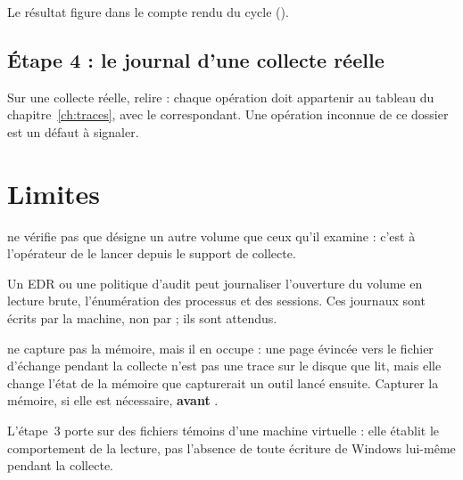 \documentclass[11pt,a4paper,oneside]{report}
\begin{document}
Le résultat figure dans le compte rendu du cycle ().

\section{Étape 4 : le journal d'une collecte réelle}

Sur une collecte réelle, relire  : chaque
opération doit appartenir au tableau du chapitre~\ref{ch:traces}, avec le
 correspondant. Une opération inconnue de ce dossier est un
défaut à signaler.

\chapter{Limites}

\begin{description}[style=nextline,leftmargin=1.2em]
  \item[Dossier de sortie] \wac{} ne vérifie pas que  désigne un
        autre volume que ceux qu'il examine : c'est à l'opérateur de le lancer
        depuis le support de collecte.
  \item[Surveillance] Un EDR ou une politique d'audit peut journaliser
        l'ouverture du volume en lecture brute, l'énumération des processus et
        des sessions. Ces journaux sont écrits par la machine, non par \wac{} ;
        ils sont attendus.
  \item[Mémoire] \wac{} ne capture pas la mémoire, mais il en occupe : une
        page évincée vers le fichier d'échange pendant la collecte n'est pas
        une trace sur le disque que \wac{} lit, mais elle change l'état de la
        mémoire que capturerait un outil lancé ensuite. Capturer la mémoire,
        si elle est nécessaire, \textbf{avant} \wac{}.
  \item[Mesure] L'étape~3 porte sur des fichiers témoins d'une machine
        virtuelle : elle établit le comportement de la lecture, pas l'absence
        de toute écriture de Windows lui-même pendant la collecte.
\end{description}
\end{document}

